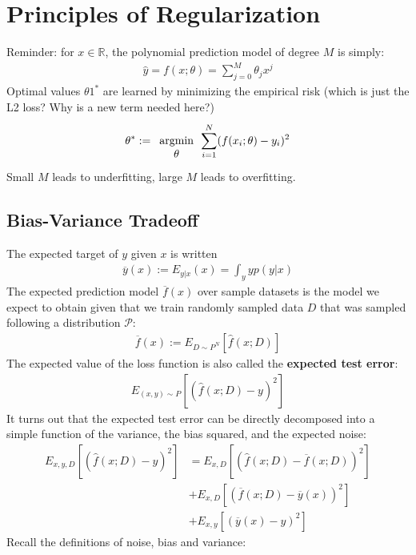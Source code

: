 \documentclass{report}
\newcommand{\tbf}{\textbf}
\newcommand{\argmin}[1] {
    \begin{array}{c}
        \vphantom{#1}\\ %
        \text{argmin}\\
        #1\\
        \end{array}
    }
\newcommand{\yhat}{\hat{y}}
\begin{document}
\chapter{Principles of Regularization}
Reminder: for $x \in \mathbb{R}$, the polynomial prediction model of degree $M$ is simply:
\begin{align}
 \yhat = f(x;\theta) = \sum_{j=0}^M \theta_j x^j
\end{align}
Optimal values $\theta1^*$ are learned by minimizing the empirical risk (which is just the L2 loss? Why is a new term needed here?)
\begin{align}
 \theta^* := \argmin{\theta} \sum_{i=1}^N (f(x_i;\theta)-y_i)^2
\end{align}
Small $M$ leads to underfitting, large $M$ leads to overfitting.
\section{Bias-Variance Tradeoff}
The expected target of $y$ given $x$ is written 
\begin{align}
 \overline{y}(x) := E_{y|x}(x) = \int_y y p(y|x)  
\end{align}
The expected prediction model $\overline{f}(x)$ over sample datasets is the model we expect to obtain given that we train randomly sampled data $D$ that was sampled following a distribution $\mathcal{P}$:
\begin{align}
 \overline{f}(x) := E_{D \sim P^N}[\hat{f}(x;D)]
\end{align}
The expected value of the loss function is also called the \tbf{expected test error}:
\begin{align}
 E_{(x,y)\sim P}[(\hat{f}(x;D)-y)^2]
\end{align}
It turns out that the expected test error can be directly decomposed into a simple function of the variance, the bias squared, and the expected noise:
\begin{align}
 E_{x,y,D}[(\hat{f}(x;D)-y)^2] &= E_{x,D}[(\hat{f}(x;D)-\overline{f}(x;D))^2]\\ &+ E_{x,D}[(\overline{f}(x;D) - \overline{y}(x))^2]\\ &+ E_{x,y}[(\overline{y}(x) - y)^2]
\end{align}
Recall the definitions of noise, bias and variance:
\end{document}
